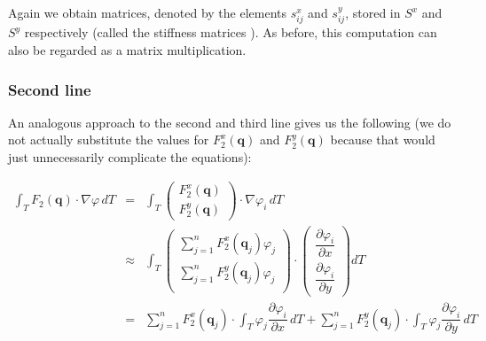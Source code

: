 \documentclass{article}
\newcommand{\pd}[2]{\dfrac{\partial #1}{\partial #2}}
\renewcommand{\phi}{\varphi}
\begin{document}
Again we obtain matrices, denoted by the elements $s_{ij}^x$ and $s_{ij}^y$, stored in $S^x$ and $S^y$ respectively (called the stiffness matrices \cite{schwaiger08adaptive}). As before, this computation can also be regarded as a matrix multiplication.

\subsubsection{Second line}
\label{sec:stiffness-second-line}

An analogous approach to the second and third line gives us the following (we do not actually substitute the values for $F_2^x(\mathbf{q})$ and $F_2^y(\mathbf{q})$ because that would just unnecessarily complicate the equations):

\begin{eqnarray}
  \label{eq:third-integral-second-line-1}
  \int_T F_2(\mathbf{q}) \cdot \nabla \phi \, dT & = &
  \int_T
  \begin{pmatrix}
    F_2^x(\mathbf{q}) \\ F_2^y(\mathbf{q})
  \end{pmatrix}
  \cdot \nabla \phi_i \, dT \\
  \label{eq:third-integral-second-line-2}
  & \approx &
  \int_T
  \begin{pmatrix}
    \sum_{j=1}^n F_2^x(\mathbf{q}_j) \phi_j \\
    \sum_{j=1}^n F_2^y(\mathbf{q}_j) \phi_j \\
  \end{pmatrix}
  \cdot
  \begin{pmatrix}
    \pd{\phi_i}{x} \\
    \pd{\phi_i}{y}
  \end{pmatrix} dT \\
  & = & \nonumber \sum_{j=1}^n F_2^x(\mathbf{q}_j) \cdot \int_T \phi_j \pd{\phi_i}{x} \, dT
   {}  + \nonumber \sum_{j=1}^n F_2^y(\mathbf{q}_j) \cdot \int_T \phi_j \pd{\phi_i}{y} \, dT

\end{eqnarray}
\end{document}
